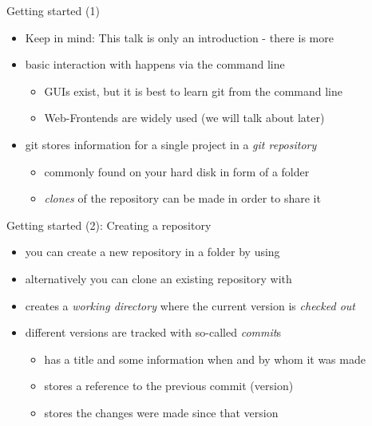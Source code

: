 \begin{frame}{Getting started (1)}
  \begin{itemize}
    \item Keep in mind: This talk is only an introduction - there is more
    \item basic interaction with \git happens via the command line
    \begin{itemize}
      \item GUIs exist, but it is best to learn git from the command line
      \item Web-Frontends are widely used (we will talk about \github later)
    \end{itemize}
    \item git stores information for a single project in a \textit{git repository}
    \begin{itemize}
      \item commonly found on your hard disk in form of a folder
      \item \textit{clones} of the repository can be made in order to share it
    \end{itemize}

  \end{itemize}
\end{frame}

\begin{frame}{Getting started (2): Creating a repository}
  \begin{itemize}
    \item you can create a new repository in a folder by using 
    \item alternatively you can clone an existing repository with 
    \item creates a \textit{working directory} where the current version is \textit{checked out}
    \item different versions are tracked with so-called \textit{commit}s
    \begin{itemize}
      \item has a title and some information when and by whom it was made
      \item stores a reference to the previous commit (version)
      \item stores the changes were made since that version
    \end{itemize}
  \end{itemize}
\end{frame}

